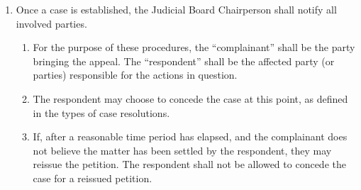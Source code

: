 \begin{enumerate}
\begin{enumerate}
\begin{enumerate}
          \item Specific relief sought.
        \end{enumerate}
      \item The Judicial Board reserves the right to evaluate and dismiss petitions unless they satisfy one of the following:
        \begin{enumerate}
          \item If the petition is submitted by a Union body, and the Union body votes by majority, it will proceed to an inquiry or hearing.
          \item Petitions related to incidents more than one semester old from the incident in question will generally not be heard.
          \item The Judicial Board reserves the right to divide a petition into multiple cases if assertions made in the petition fall into different case types.
          \item The Judicial Board will hold an inquiry meeting to determine the validity of a petition. If a petition is considered valid, it is henceforth considered a case. If the petition is invalid, official notice is sent to the complainant dismissing the case.
        \end{enumerate}
      \item A petition may request an injunction against an action.
        \begin{enumerate}
          \item If a petition requests an injunction, an inquiry meeting will be held within 24 hours to vote on granting the injunction.
        \end{enumerate}
    \end{enumerate}
  \item Once a case is established, the Judicial Board Chairperson shall notify all involved parties.
    \begin{enumerate}
      \item For the purpose of these procedures, the ``complainant'' shall be the party bringing the appeal. The ``respondent'' shall be the affected party (or parties) responsible for the actions in question.
      \item The respondent may choose to concede the case at this point, as defined in the types of case resolutions.
      \item If, after a reasonable time period has elapsed, and the complainant does not believe the matter has been settled by the respondent, they may reissue the petition. The respondent shall not be allowed to concede the case for a reissued petition.

\end{enumerate}
\end{enumerate}
